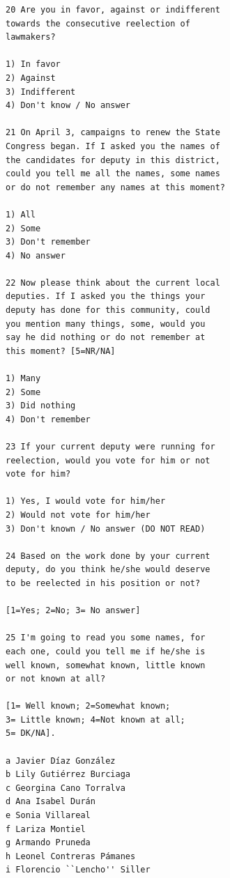 \documentclass[letter,12pt]{article}
\begin{document}
\begin{multicols}{2}

\begin{scriptsize}
\begin{verbatim}
20 Are you in favor, against or indifferent 
towards the consecutive reelection of 
lawmakers?

1) In favor 
2) Against
3) Indifferent
4) Don't know / No answer

21 On April 3, campaigns to renew the State 
Congress began. If I asked you the names of 
the candidates for deputy in this district, 
could you tell me all the names, some names 
or do not remember any names at this moment?

1) All 
2) Some
3) Don't remember
4) No answer

22 Now please think about the current local 
deputies. If I asked you the things your 
deputy has done for this community, could 
you mention many things, some, would you 
say he did nothing or do not remember at 
this moment? [5=NR/NA]

1) Many
2) Some
3) Did nothing
4) Don't remember

23 If your current deputy were running for 
reelection, would you vote for him or not 
vote for him?

1) Yes, I would vote for him/her
2) Would not vote for him/her
3) Don't known / No answer (DO NOT READ)

24 Based on the work done by your current 
deputy, do you think he/she would deserve 
to be reelected in his position or not?

[1=Yes; 2=No; 3= No answer]

25 I'm going to read you some names, for 
each one, could you tell me if he/she is 
well known, somewhat known, little known 
or not known at all?

[1= Well known; 2=Somewhat known; 
3= Little known; 4=Not known at all; 
5= DK/NA].

a Javier Díaz González     
b Lily Gutiérrez Burciaga  
c Georgina Cano Torralva   
d Ana Isabel Durán         
e Sonia Villareal          
f Lariza Montiel           
g Armando Pruneda          
h Leonel Contreras Pámanes 
i Florencio ``Lencho'' Siller
\end{verbatim}
\end{scriptsize}




\end{multicols}
\end{document}
